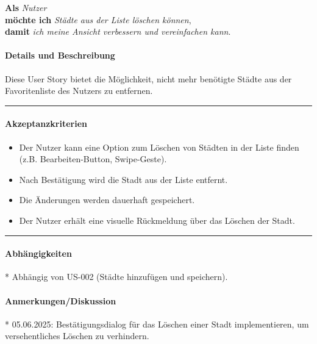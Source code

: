 \documentclass{article}
\begin{document}
\vspace{0.5em}

\textcolor{storygreen}{\textbf{Als}} \textit{Nutzer} \\
\textcolor{storygreen}{\textbf{möchte ich}} \textit{Städte aus der Liste löschen können}, \\
\textcolor{storygreen}{\textbf{damit}} \textit{ich meine Ansicht verbessern und vereinfachen kann}.

\vspace{1em}

\paragraph{Details und Beschreibung}
Diese User Story bietet die Möglichkeit, nicht mehr benötigte Städte aus der Favoritenliste des Nutzers zu entfernen.

\vspace{0.5em}
\hrule

\paragraph{Akzeptanzkriterien}
\begin{itemize}
    \item Der Nutzer kann eine Option zum Löschen von Städten in der Liste finden (z.B. Bearbeiten-Button, Swipe-Geste).
    \item Nach Bestätigung wird die Stadt aus der Liste entfernt.
    \item Die Änderungen werden dauerhaft gespeichert.
    \item Der Nutzer erhält eine visuelle Rückmeldung über das Löschen der Stadt.
\end{itemize}

\vspace{0.5em}
\hrule

\paragraph{Abhängigkeiten}
* Abhängig von US-002 (Städte hinzufügen und speichern).

\paragraph{Anmerkungen/Diskussion}
* 05.06.2025: Bestätigungsdialog für das Löschen einer Stadt implementieren, um versehentliches Löschen zu verhindern.

\clearpage
\end{document}
